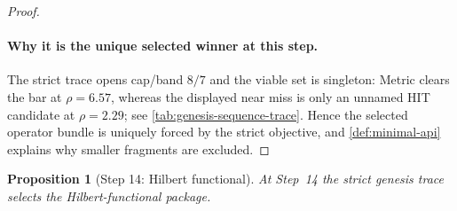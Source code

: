 \documentclass[11pt,a4paper]{article}
\theoremstyle{plain}
\newtheorem{proposition}[theorem]{Proposition}
\theoremstyle{definition}
\theoremstyle{remark}
\begin{document}
\begin{proof}
\paragraph{Why it is the unique selected winner at this step.}
The strict trace opens cap/band $8/7$ and the viable set is singleton:
Metric clears the bar at $\rho=6.57$, whereas the displayed near miss is only an
unnamed HIT candidate at $\rho=2.29$; see
\cref{tab:genesis-sequence-trace}.
Hence the selected operator bundle is uniquely forced by the strict objective, and
\cref{def:minimal-api} explains why smaller fragments are excluded.
\end{proof}

\begin{proposition}[Step 14: Hilbert functional]
\label{prop:genesis-step14}
At Step~14 the strict genesis trace selects the Hilbert-functional package.
\end{proposition}
\end{document}
